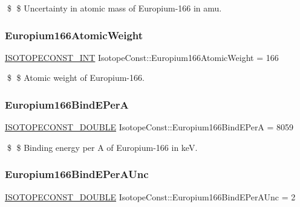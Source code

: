 \$ \$ Uncertainty in atomic mass of Europium-\/166 in amu. \mbox{\label{group___isotope_const-_europium-_eu166_gaae8e5b60f7a3a90a212b5fba30c57c69}} 
\subsubsection{\texorpdfstring{Europium166\+Atomic\+Weight}{Europium166AtomicWeight}}
{\footnotesize\ttfamily \mbox{\hyperlink{group___isotope_const-_macros_ga5f18360b3e99483a35c32d789e62621c}{I\+S\+O\+T\+O\+P\+E\+C\+O\+N\+S\+T\+\_\+\+I\+NT}} Isotope\+Const\+::\+Europium166\+Atomic\+Weight = 166}

\$ \$ Atomic weight of Europium-\/166. \mbox{\label{group___isotope_const-_europium-_eu166_ga2a6cecd5c3b32380b45e587f0531439d}} 
\subsubsection{\texorpdfstring{Europium166\+Bind\+E\+PerA}{Europium166BindEPerA}}
{\footnotesize\ttfamily \mbox{\hyperlink{group___isotope_const-_macros_ga8f45a7272ce02c0b4c65c44636ed719a}{I\+S\+O\+T\+O\+P\+E\+C\+O\+N\+S\+T\+\_\+\+D\+O\+U\+B\+LE}} Isotope\+Const\+::\+Europium166\+Bind\+E\+PerA = 8059}

\$ \$ Binding energy per A of Europium-\/166 in keV. \mbox{\label{group___isotope_const-_europium-_eu166_ga783d8267f7506da643f19321a34f6240}} 
\subsubsection{\texorpdfstring{Europium166\+Bind\+E\+Per\+A\+Unc}{Europium166BindEPerAUnc}}
{\footnotesize\ttfamily \mbox{\hyperlink{group___isotope_const-_macros_ga8f45a7272ce02c0b4c65c44636ed719a}{I\+S\+O\+T\+O\+P\+E\+C\+O\+N\+S\+T\+\_\+\+D\+O\+U\+B\+LE}} Isotope\+Const\+::\+Europium166\+Bind\+E\+Per\+A\+Unc = 2}

